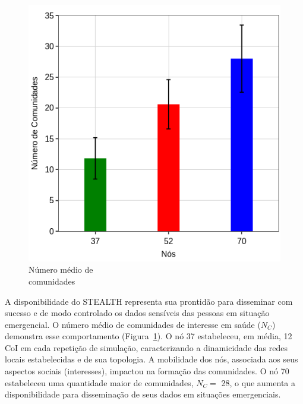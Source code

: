 \documentclass[12pt]{article}
\begin{document}
\begin{figure}
\centering
\includegraphics[width=.35\textwidth]{figures/coi_mean_performance_3_SBSEG19_v2.png}
\vspace{-0.5cm}
\caption[Número médio de comunidades]
{Número médio de \\ comunidades\endtabular}
\label{fig:coiEstabelecidas}
\end{figure}    


A
disponibilidade
do STEALTH
representa sua
prontidão
para disseminar com sucesso e de modo controlado os dados sensíveis das pessoas em situação emergencial.
O
número médio de comunidades de interesse em saúde ($N_{C}$) demonstra esse comportamento (Figura~\ref{fig:coiEstabelecidas}).
O nó 37 estabeleceu, em média, 12 CoI
em
cada repetição de simulação,
caracterizando
a dinamicidade das redes locais estabelecidas
e de sua topologia. A mobilidade dos nós,
associada aos seus aspectos sociais (interesses),
impactou na formação
das
comunidades. O nó 70 estabeleceu uma quantidade
maior de comunidades, $N_C=$ 28, o que aumenta a disponibilidade para disseminação de seus dados em situações emergenciais.
\end{document}
